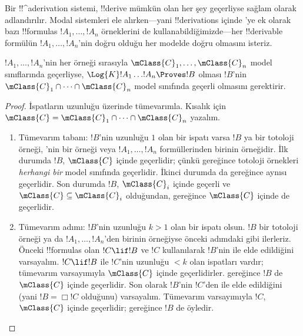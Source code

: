 



Bir !!^a{derivation} sistemi, !!{derive} mümkün olan her şey geçerliyse sağlam
olarak adlandırılır. Modal sistemleri ele alırken---yani !!{derivation}s
içinde 'ye ek olarak bazı !!{formula}s $!A_1,\dots,!A_n$ örneklerini
de kullanabildiğimizde---her !!{derivable} formülün
$!A_1,\dots,!A_n$'nin doğru olduğu her modelde doğru olmasını isteriz.

\begin{thm}
  $!A_1,\dots,!A_n$'nin her örneği sırasıyla
  $\mClass{C}_1,\dots,\mClass{C}_n$ model sınıflarında geçerliyse,
  $\Log{K}!A_1\dots !A_n\Proves !B$ olması $!B$'nin
  $\mClass{C}_1\cap\dots\cap\mClass{C}_n$ model sınıfında geçerli olmasını
  gerektirir.
\end{thm}

\begin{proof}
  İspatların uzunluğu üzerinde tümevarımla. Kısalık için
  $\mClass{C}=\mClass{C}_1\cap\dots\cap\mClass{C}_n$ yazalım.
  \begin{enumerate}
  \item Tümevarım tabanı: $!B$'nin uzunluğu $1$ olan bir ispatı varsa $!B$
    ya bir totoloji örneği, 'nin
    bir örneği veya $!A_1,\dots,!A_n$ formüllerinden birinin örneğidir.
    İlk durumda $!B$, $\mClass{C}$ içinde geçerlidir; çünkü
     gereğince totoloji örnekleri
    \emph{herhangi bir} model sınıfında geçerlidir. İkinci durumda da
     gereğince aynısı geçerlidir.
    Son durumda $!B$, $\mClass{C}_i$ içinde geçerli ve
    $\mClass{C}\subseteq\mClass{C}_i$ olduğundan,
     gereğince $\mClass{C}$ içinde de
    geçerlidir.
  \item Tümevarım adımı: $!B$'nin uzunluğu $k>1$ olan bir ispatı olsun.
    $!B$ bir totoloji örneği ya da $!A_1,\dots,!A_n$'den birinin örneğiyse
    önceki adımdaki gibi ilerleriz. Önceki !!{formula}s olan
    $!C\lif !B$ ve $!C$ kullanılarak $!B$'nin \MP{} ile elde edildiğini varsayalım.
    $!C\lif !B$ ile $!C$'nin uzunluğu $<k$ olan ispatları vardır; tümevarım varsayımıyla
    $\mClass{C}$ içinde geçerlidirler. 
    gereğince $!B$ de $\mClass{C}$ içinde geçerlidir. Son olarak $!B$'nin
    $!C$'den \Nec{} ile elde edildiğini (yani $!B=\Box!C$ olduğunu)
    varsayalım. Tümevarım varsayımıyla $!C$, $\mClass{C}$ içinde geçerlidir;
     gereğince $!B$ de öyledir.
  \end{enumerate}
\end{proof}

